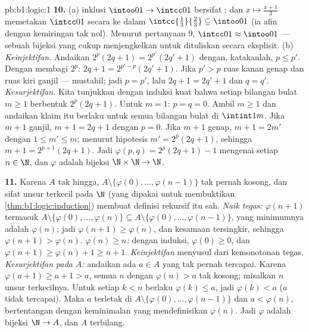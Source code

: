 \begin{solution}{pb:b1:logic:1}
\textbf{10.} (a)  inklusi $\intoo01 \to \intcc01$ bersifat ;
dan $x \mapsto \frac{x + 1}3$ memetakan $\intcc01$ secara  ke dalam
$\intcc{\frac13}{\frac23} \subseteq \intoo01$ (ia afin dengan
kemiringan tak nol). Menurut pertanyaan 9, $\intcc01 \approx \intoo01$ --- sebuah
bijeksi yang cukup menjengkelkan untuk dituliskan secara eksplisit.
(b) \emph{Keinjektifan.} Andaikan $2^p(2q + 1) = 2^{p'}(2q' + 1)$ dengan,
katakanlah, $p \leq p'$. Dengan membagi $2^p$: $2q + 1 = 2^{p' - p}(2q' + 1)$.
Jika $p' > p$ ruas kanan genap dan ruas kiri ganjil ---
mustahil; jadi $p = p'$, lalu $2q + 1 = 2q' + 1$ dan $q = q'$.
\emph{Kesurjektifan.} Kita tunjukkan dengan induksi kuat bahwa setiap bilangan bulat
$m \geq 1$ berbentuk $2^p(2q + 1)$. Untuk $m = 1$: $p = q = 0$.
Ambil $m \geq 1$ dan andaikan klaim itu berlaku untuk semua bilangan bulat di
$\intint1m$. Jika $m + 1$ ganjil, $m + 1 = 2q + 1$ dengan $p = 0$. Jika
$m + 1$ genap, $m + 1 = 2m'$ dengan $1 \leq m' \leq m$; menurut
hipotesis $m' = 2^p(2q + 1)$, sehingga $m + 1 = 2^{p+1}(2q + 1)$. Jadi
$\varphi(p, q) = 2^p(2q + 1) - 1$ mengenai setiap $n \in \N$, dan
$\varphi$ adalah bijeksi $\N \times \N \to \N$.

\textbf{11.} Karena $A$ tak hingga, $A \setminus \{\varphi(0), \dots,
\varphi(n - 1)\}$ tak pernah kosong, dan sifat unsur terkecil pada
$\N$ (yang dipakai untuk membuktikan \cref{thm:b1:logic:induction}) membuat
definisi rekursif itu sah. \emph{Naik tegas:}
$\varphi(n + 1)$ termasuk $A \setminus \{\varphi(0), \dots,
\varphi(n)\} \subseteq A \setminus \{\varphi(0), \dots, \varphi(n -
1)\}$, yang minimumnya adalah $\varphi(n)$; jadi $\varphi(n + 1) \geq
\varphi(n)$, dan kesamaan tersingkir, sehingga $\varphi(n+1) >
\varphi(n)$. \emph{$\varphi(n) \geq n$:} dengan induksi, $\varphi(0)
\geq 0$, dan $\varphi(n + 1) \geq \varphi(n) + 1 \geq n + 1$.
\emph{Keinjektifan} menyusul dari kemonotonan tegas.
\emph{Kesurjektifan pada $A$:} andaikan ada $a \in A$ yang tak pernah
tercapai. Karena $\varphi(a + 1) \geq a + 1 > a$,  semua $n$ dengan
$\varphi(n) > a$ tak kosong; misalkan $n$ unsur terkecilnya. Untuk setiap
$k < n$ berlaku $\varphi(k) \leq a$, jadi $\varphi(k) < a$ ($a$ tidak
tercapai). Maka $a$ terletak di $A \setminus \{\varphi(0), \dots,
\varphi(n - 1)\}$ dan $a < \varphi(n)$, bertentangan dengan keminimalan
yang mendefinisikan $\varphi(n)$. Jadi $\varphi$ adalah bijeksi $\N \to A$, dan
$A$ terbilang.


\end{solution}
